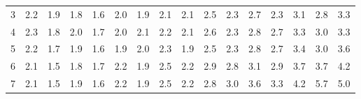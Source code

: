 \begin{table}[!htbp]
\begin{tabular}{c|ccccccccccccccc}
    \rowcolor[HTML]{FFFFFF} 
    3                          & \multicolumn{1}{l|}{\cellcolor[HTML]{FFFFFF}2.2} & \cellcolor[HTML]{CCC0DA}1.9 & \cellcolor[HTML]{CCC0DA}1.8 & \cellcolor[HTML]{CCC0DA}1.6 & \cellcolor[HTML]{CCC0DA}2.0 & \multicolumn{1}{l|}{\cellcolor[HTML]{CCC0DA}1.9} & 2.1                        & 2.1                         & 2.5                         & 2.3                         & 2.7                         & 2.3                         & 3.1                         & 2.8                         & 3.3                         \\
    \rowcolor[HTML]{FFFFFF} 
    4                          & \multicolumn{1}{l|}{\cellcolor[HTML]{FFFFFF}2.3} & \cellcolor[HTML]{CCC0DA}1.8 & \cellcolor[HTML]{CCC0DA}2.0 & \cellcolor[HTML]{CCC0DA}1.7 & \cellcolor[HTML]{CCC0DA}2.0 & \multicolumn{1}{l|}{\cellcolor[HTML]{FFFFFF}2.1} & 2.2                        & 2.1                         & 2.6                         & 2.3                         & 2.8                         & 2.7                         & 3.3                         & 3.0                         & 3.3                         \\
    \rowcolor[HTML]{FFFFFF} 
    5                          & \multicolumn{1}{l|}{\cellcolor[HTML]{FFFFFF}2.2} & \cellcolor[HTML]{CCC0DA}1.7 & \cellcolor[HTML]{CCC0DA}1.9 & \cellcolor[HTML]{CCC0DA}1.6 & \cellcolor[HTML]{CCC0DA}1.9 & \multicolumn{1}{l|}{\cellcolor[HTML]{CCC0DA}2.0} & 2.3                        & \cellcolor[HTML]{CCC0DA}1.9 & 2.5                         & 2.3                         & 2.8                         & 2.7                         & 3.4                         & 3.0                         & 3.6                         \\
    \rowcolor[HTML]{FFFFFF} 
    6                          & \multicolumn{1}{l|}{\cellcolor[HTML]{FFFFFF}2.1} & \cellcolor[HTML]{B1A0C7}1.5 & \cellcolor[HTML]{CCC0DA}1.8 & \cellcolor[HTML]{CCC0DA}1.7 & 2.2                         & \multicolumn{1}{l|}{\cellcolor[HTML]{CCC0DA}1.9} & 2.5                        & 2.2                         & 2.9                         & 2.8                         & 3.1                         & 2.9                         & 3.7                         & 3.7                         & 4.2                         \\
    \rowcolor[HTML]{FFFFFF} 
    7                          & \multicolumn{1}{l|}{\cellcolor[HTML]{FFFFFF}2.1} & \cellcolor[HTML]{CCC0DA}1.5 & \cellcolor[HTML]{CCC0DA}1.9 & \cellcolor[HTML]{CCC0DA}1.6 & 2.2                         & \multicolumn{1}{l|}{\cellcolor[HTML]{CCC0DA}1.9} & 2.5                        & 2.2                         & 2.8                         & 3.0                         & 3.6                         & 3.3                       & 4.2                         & 5.7                         & 5.0                         \\

\end{tabular}
\end{table}
